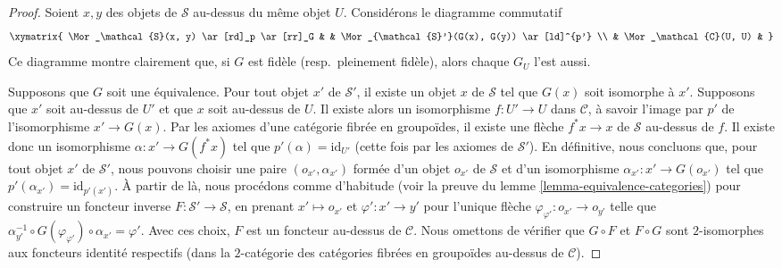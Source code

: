 \begin{proof}
Soient $x, y$ des objets de $\mathcal{S}$ au-dessus du même objet $U$.
Considérons le diagramme commutatif
$$
\xymatrix{
\Mor_\mathcal{S}(x, y) \ar[rd]_p \ar[rr]_G & &
\Mor_{\mathcal{S}'}(G(x), G(y)) \ar[ld]^{p'} \\
& \Mor_\mathcal{C}(U, U) &
}
$$
Ce diagramme montre clairement que, si $G$ est fidèle (resp.\ pleinement fidèle),
alors chaque $G_U$ l'est aussi.

\medskip\noindent
Supposons que $G$ soit une équivalence. Pour tout objet
$x'$ de $\mathcal{S}'$, il existe un objet $x$ de $\mathcal{S}$
tel que $G(x)$ soit isomorphe à $x'$. Supposons que $x'$ soit
au-dessus de $U'$ et que $x$ soit au-dessus de $U$. Il existe alors un isomorphisme
$f : U' \to U$ dans $\mathcal{C}$, à savoir l'image par $p'$ de
l'isomorphisme $x' \to G(x)$. Par les axiomes d'une catégorie fibrée
en groupoïdes, il existe une flèche $f^*x \to x$ de $\mathcal{S}$
au-dessus de $f$. Il existe donc un isomorphisme
$\alpha : x' \to G(f^*x)$ tel que $p'(\alpha) = \text{id}_{U'}$
(cette fois par les axiomes de $\mathcal{S}'$). En définitive, nous concluons
que, pour tout objet $x'$ de $\mathcal{S}'$, nous pouvons choisir
une paire $(o_{x'}, \alpha_{x'})$ formée d'un objet
$o_{x'}$ de $\mathcal{S}$ et d'un isomorphisme $\alpha_{x'} : x' \to G(o_{x'})$
tel que $p'(\alpha_{x'}) = \text{id}_{p'(x')}$. À partir de là,
nous procédons comme d'habitude (voir la preuve du
lemme \ref{lemma-equivalence-categories}) pour construire un foncteur
inverse $F : \mathcal{S}' \to \mathcal{S}$, en prenant
$x' \mapsto o_{x'}$ et $\varphi' : x' \to y'$ pour l'unique
flèche $\varphi_{\varphi'} : o_{x'} \to o_{y'}$ telle que
$\alpha_{y'}^{-1} \circ G(\varphi_{\varphi'}) \circ \alpha_{x'} = \varphi'$.
Avec ces choix, $F$ est un foncteur au-dessus de $\mathcal{C}$.
Nous omettons de vérifier que $G \circ F$ et $F \circ G$ sont
$2$-isomorphes aux foncteurs identité respectifs
(dans la $2$-catégorie des catégories fibrées en groupoïdes au-dessus de $\mathcal{C}$).


\end{proof}
